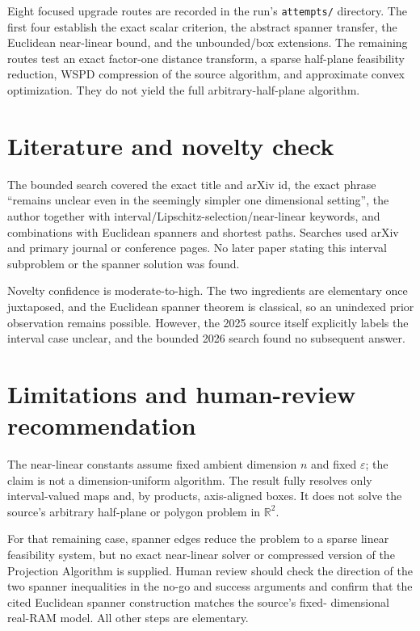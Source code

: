 \documentclass[11pt]{article}
\newcommand{\R}{\mathbb R}
\begin{document}
Eight focused upgrade routes are recorded in the run's \texttt{attempts/}
directory. The first four establish the exact scalar criterion, the abstract
spanner transfer, the Euclidean near-linear bound, and the unbounded/box
extensions. The remaining routes test an exact factor-one distance transform,
a sparse half-plane feasibility reduction, WSPD compression of the source
algorithm, and approximate convex optimization. They do not yield the full
arbitrary-half-plane algorithm.

\section{Literature and novelty check}

The bounded search covered the exact title and arXiv id, the exact phrase
``remains unclear even in the seemingly simpler one dimensional setting'',
the author together with interval/Lipschitz-selection/near-linear keywords,
and combinations with Euclidean spanners and shortest paths. Searches used
arXiv and primary journal or conference pages. No later paper stating this
interval subproblem or the spanner solution was found.

Novelty confidence is moderate-to-high. The two ingredients are elementary
once juxtaposed, and the Euclidean spanner theorem is classical, so an
unindexed prior observation remains possible. However, the 2025 source itself
explicitly labels the interval case unclear, and the bounded 2026 search found
no subsequent answer.

\section{Limitations and human-review recommendation}

The near-linear constants assume fixed ambient dimension $n$ and fixed
$\varepsilon$; the claim is not a dimension-uniform algorithm. The result
fully resolves only interval-valued maps and, by products, axis-aligned boxes.
It does not solve the source's arbitrary half-plane or polygon problem in
$\R^2$.

For that remaining case, spanner edges reduce the problem to a sparse linear
feasibility system, but no exact near-linear solver or compressed version of
the Projection Algorithm is supplied. Human review should check the direction
of the two spanner inequalities in the no-go and success arguments and confirm
that the cited Euclidean spanner construction matches the source's fixed-
dimensional real-RAM model. All other steps are elementary.
\end{document}
